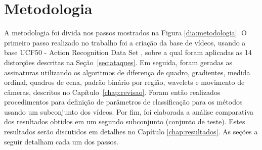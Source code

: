 
\chapter{Metodologia}
\label{chap:metodologia}

A metodologia foi divida nos passos mostrados na Figura \ref{dia:metodologia}. O primeiro passo realizado no trabalho foi a criação da base de vídeos, usando a base UCF50 - Action Recognition Data Set \cite{reddy2013recognizing}, sobre a qual foram aplicadas as 14 distorções descritas na Seção~\ref{sec:ataques}. Em seguida, foram geradas as assinaturas utilizando os algoritmos de diferença de quadro, gradientes, medida ordinal, quadros de cena, padrão binário por região, wavelets e movimento de câmeras, descritos no Capítulo~\ref{chap:revisao}. Foram então realizados procedimentos para definição de parâmetros de classificação para os métodos usando um subconjunto dos vídeos. Por fim, foi elaborada a análise comparativa dos resultados obtidos em um segundo subconjunto (conjunto de teste). Estes resultados serão discutidos em detalhes no Capítulo \ref{chap:resultados}. As seções a seguir detalham cada um dos passos.


